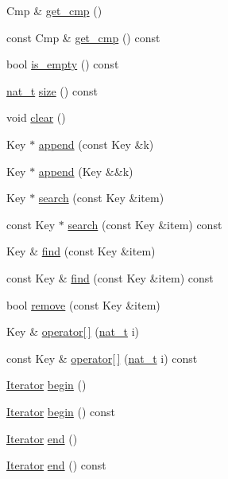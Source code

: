 \begin{DoxyCompactItemize}
\item 
Cmp \& \hyperlink{class_designar_1_1_gen_array_set_aceb48fb98d254005b82fd538b6ac0c35}{get\+\_\+cmp} ()
\item 
const Cmp \& \hyperlink{class_designar_1_1_gen_array_set_a30409051572881ed638f79debfad8188}{get\+\_\+cmp} () const
\item 
bool \hyperlink{class_designar_1_1_gen_array_set_aca8ce9f7cb1ded74fd8067a535817836}{is\+\_\+empty} () const
\item 
\hyperlink{namespace_designar_aa72662848b9f4815e7bf31a7cf3e33d1}{nat\+\_\+t} \hyperlink{class_designar_1_1_gen_array_set_ab5b56f597b39e2dbf03514a2eb096e8a}{size} () const
\item 
void \hyperlink{class_designar_1_1_gen_array_set_aa1b1d249debb38432e56b2e585d822af}{clear} ()
\item 
Key $\ast$ \hyperlink{class_designar_1_1_gen_array_set_ac1367b0dd7bc3f90fc73101991dc398a}{append} (const Key \&k)
\item 
Key $\ast$ \hyperlink{class_designar_1_1_gen_array_set_aafb9d33d1a9a6f5b07d434705290b7bc}{append} (Key \&\&k)
\item 
Key $\ast$ \hyperlink{class_designar_1_1_gen_array_set_ab6e8baee6087d491045de115ed7fb48e}{search} (const Key \&item)
\item 
const Key $\ast$ \hyperlink{class_designar_1_1_gen_array_set_adbe26651c80bbcc92afe2563f6bcefc3}{search} (const Key \&item) const
\item 
Key \& \hyperlink{class_designar_1_1_gen_array_set_a91015348562e7127f2612ad5c13fa016}{find} (const Key \&item)
\item 
const Key \& \hyperlink{class_designar_1_1_gen_array_set_aab0576267b8f88e6e7ec2d31aa768449}{find} (const Key \&item) const
\item 
bool \hyperlink{class_designar_1_1_gen_array_set_acddff41221307179e0b4c20afbcfe253}{remove} (const Key \&item)
\item 
Key \& \hyperlink{class_designar_1_1_gen_array_set_ad721fdfba3af03c084a9bbfe5ec67fd8}{operator\mbox{[}$\,$\mbox{]}} (\hyperlink{namespace_designar_aa72662848b9f4815e7bf31a7cf3e33d1}{nat\+\_\+t} i)
\item 
const Key \& \hyperlink{class_designar_1_1_gen_array_set_a2731e12c87e08bc42ac16496569ebf5a}{operator\mbox{[}$\,$\mbox{]}} (\hyperlink{namespace_designar_aa72662848b9f4815e7bf31a7cf3e33d1}{nat\+\_\+t} i) const
\item 
\hyperlink{class_designar_1_1_gen_array_set_1_1_iterator}{Iterator} \hyperlink{class_designar_1_1_gen_array_set_af736c7af596752d636881374f0d45f4c}{begin} ()
\item 
\hyperlink{class_designar_1_1_gen_array_set_1_1_iterator}{Iterator} \hyperlink{class_designar_1_1_gen_array_set_a9bccd51f6d73a05400361cf5deff8aac}{begin} () const
\item 
\hyperlink{class_designar_1_1_gen_array_set_1_1_iterator}{Iterator} \hyperlink{class_designar_1_1_gen_array_set_a23644b099a1bf858784e474d833245a8}{end} ()
\item 
\hyperlink{class_designar_1_1_gen_array_set_1_1_iterator}{Iterator} \hyperlink{class_designar_1_1_gen_array_set_ade46fb4605ffb1e08d6475a7aacd6024}{end} () const
\end{DoxyCompactItemize}
